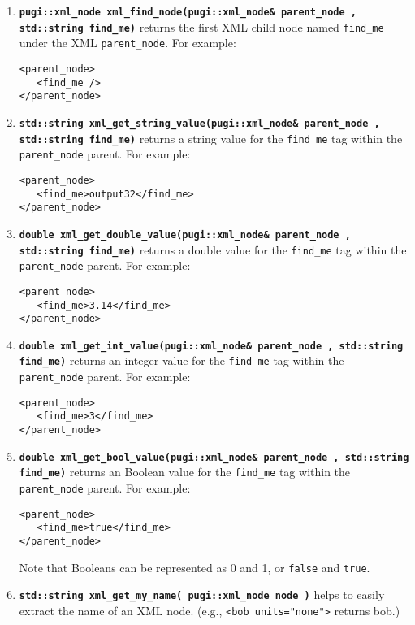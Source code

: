 \documentclass[12pt]{article}
\renewcommand{\v}{\verb}
\newcommand{\smallcode}[1]{\textbf{\texttt{#1}}}
\begin{document}
\begin{enumerate}
\item 
\smallcode{pugi::xml\_node xml\_find\_node(pugi::xml\_node\& parent\_node , std::string find\_me)} 
returns the first XML child node named \v|find_me| under the XML \v|parent_node|. For example: 

\begin{verbatim}
<parent_node>
   <find_me />
</parent_node>
\end{verbatim}

\item 
\smallcode{std::string xml\_get\_string\_value(pugi::xml\_node\& parent\_node , std::string find\_me)} returns a string value for the \v|find_me| tag within the \v|parent_node| parent. For example: 

\begin{verbatim}
<parent_node>
   <find_me>output32</find_me> 
</parent_node>
\end{verbatim}

\item 
\smallcode{double xml\_get\_double\_value(pugi::xml\_node\& parent\_node , std::string find\_me)}
returns a double value for the \v|find_me| tag within the \v|parent_node| parent. For example: 

\begin{verbatim}
<parent_node>
   <find_me>3.14</find_me> 
</parent_node>
\end{verbatim}

\item 
\smallcode{double xml\_get\_int\_value(pugi::xml\_node\& parent\_node , std::string find\_me)}
returns an integer value for the \v|find_me| tag within the \v|parent_node| parent. For example: 

\begin{verbatim}
<parent_node>
   <find_me>3</find_me> 
</parent_node>
\end{verbatim}

\item 
\smallcode{double xml\_get\_bool\_value(pugi::xml\_node\& parent\_node , std::string find\_me)}
returns an Boolean value for the \v|find_me| tag within the \v|parent_node| parent. For example: 

\begin{verbatim}
<parent_node>
   <find_me>true</find_me> 
</parent_node>
\end{verbatim}
Note that Booleans can be represented as 0 and 1, or \v|false| and \v|true|. 


\item 
\smallcode{std::string xml\_get\_my\_name( pugi::xml\_node node )} helps to easily extract the name of an XML node. (e.g., \v|<bob units="none">| returns bob.) 


\end{enumerate}
\end{document}

